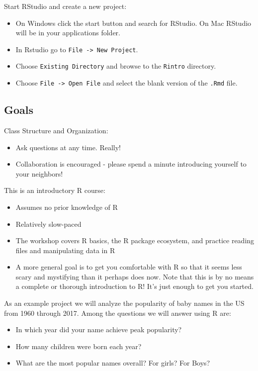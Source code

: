 \documentclass[]{book}
\providecommand{\tightlist}{%
  \setlength{\itemsep}{0pt}\setlength{\parskip}{0pt}}
\begin{document}
Start RStudio and create a new project:

\begin{itemize}
\tightlist
\item
  On Windows click the start button and search for RStudio. On Mac
  RStudio will be in your applications folder.
\item
  In Rstudio go to \texttt{File\ -\textgreater{}\ New\ Project}.
\item
  Choose \texttt{Existing\ Directory} and browse to the \texttt{Rintro}
  directory.
\item
  Choose \texttt{File\ -\textgreater{}\ Open\ File} and select the blank
  version of the \texttt{.Rmd} file.
\end{itemize}

\subsection{Goals}\label{goals}

Class Structure and Organization:

\begin{itemize}
\tightlist
\item
  Ask questions at any time. Really!
\item
  Collaboration is encouraged - please spend a minute introducing
  yourself to your neighbors!
\end{itemize}

This is an introductory R course:

\begin{itemize}
\tightlist
\item
  Assumes no prior knowledge of R
\item
  Relatively slow-paced
\item
  The workshop covers R basics, the R package ecosystem, and practice
  reading files and manipulating data in R
\item
  A more general goal is to get you comfortable with R so that it seems
  less scary and mystifying than it perhaps does now. Note that this is
  by no means a complete or thorough introduction to R! It's just enough
  to get you started.
\end{itemize}

As an example project we will analyze the popularity of baby names in
the US from 1960 through 2017. Among the questions we will answer using
R are:

\begin{itemize}
\tightlist
\item
  In which year did your name achieve peak popularity?
\item
  How many children were born each year?
\item
  What are the most popular names overall? For girls? For Boys?
\end{itemize}
\end{document}
